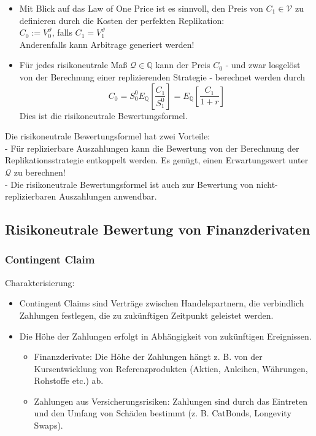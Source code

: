 \documentclass[12pt]{report}
\theoremstyle{dotless}
\theoremstyle{definition}
\begin{document}
\begin{itemize}
\item Mit Blick auf das Law of One Price ist es sinnvoll, den Preis von $C_1 \in \mathcal{V}$ zu definieren durch die Kosten der perfekten Replikation: \\
$C_0:= V_0^\vartheta$, falls $C_1=V_1^\vartheta$ \\
Anderenfalls kann Arbitrage generiert werden!
\item Für jedes risikoneutrale Maß $\mathcal{Q} \in \mathbb{Q}$ kann der Preis $C_0$ - und zwar losgelöst von der Berechnung einer replizierenden Strategie - berechnet werden durch
\begin{equation}
C_0= S_0^0E_\mathbb{Q} \left[ \frac{C_1}{S_1^0} \right] = E_\mathbb{Q} \left[ \frac{C_1}{1+r} \right]
\end{equation}
Dies ist die risikoneutrale Bewertungsformel.
\end{itemize}


Die risikoneutrale Bewertungsformel hat zwei Vorteile:\\ 
- Für replizierbare Auszahlungen kann die Bewertung von der Berechnung der
Replikationsstrategie entkoppelt werden. Es genügt, einen Erwartungswert
unter $\mathcal{Q}$ zu berechnen! \\
- Die risikoneutrale Bewertungsformel ist auch zur Bewertung von
nicht-replizierbaren Auszahlungen anwendbar.


\subsection{Risikoneutrale Bewertung von Finanzderivaten }


\subsubsection{Contingent Claim}
Charakterisierung:
\begin{itemize}
\item Contingent Claims sind Verträge zwischen Handelspartnern, die verbindlich
Zahlungen festlegen, die zu zukünftigen Zeitpunkt geleistet werden.
\item Die Höhe der Zahlungen erfolgt in Abhängigkeit von zukünftigen Ereignissen.
\begin{itemize}
\item Finanzderivate: Die Höhe der Zahlungen hängt z. B. von der Kursentwicklung
von Referenzprodukten (Aktien, Anleihen, Währungen, Rohstoffe etc.) ab.
\item Zahlungen aus Versicherungsrisiken: Zahlungen sind durch das Eintreten und
den Umfang von Schäden bestimmt (z. B. CatBonds, Longevity Swaps).
\end{itemize}
\end{itemize}
\end{document}

